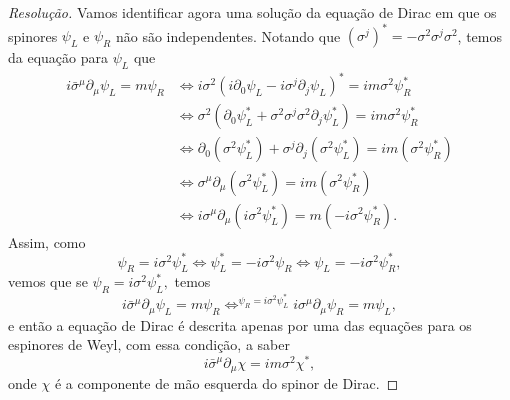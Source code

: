 \begin{proof}[Resolução]
    Vamos identificar agora uma solução da equação de Dirac em que os spinores \(\psi_L\) e \(\psi_R\) não são independentes. Notando que \((\sigma^j)^* = - \sigma^2 \sigma^j \sigma^2\), temos da equação para \(\psi_L\) que
    \begin{align*}
        i \bar{\sigma}^\mu \partial_\mu \psi_L = m \psi_R
        &\iff i\sigma^2 (i \partial_0 \psi_L - i \sigma^j\partial_j \psi_L)^* = im \sigma^2 \psi_R^*\\
        &\iff \sigma^2(\partial_0 \psi_L^* + \sigma^2 \sigma^j \sigma^2 \partial_j \psi_L^*) = im \sigma^2 \psi_R^*\\
        &\iff \partial_0 (\sigma^2 \psi_L^*) + \sigma^j \partial_j (\sigma^2 \psi_L^*) = im (\sigma^2 \psi_R^*)\\
        &\iff \sigma^\mu\partial_\mu (\sigma^2 \psi_L^*) = im (\sigma^2\psi_R^*)\\
        &\iff i \sigma^\mu \partial_\mu (i\sigma^2 \psi_L^*) = m(-i \sigma^2\psi_R^*).
    \end{align*}
    Assim, como
    \begin{equation*}
        \psi_R = i\sigma^2 \psi_L^*
        \iff \psi_L^* = -i\sigma^2 \psi_R
        \iff \psi_L = -i \sigma^2 \psi_R^*,
    \end{equation*}
    vemos que se \(\psi_R = i \sigma^2 \psi_L^*,\) temos
    \begin{equation*}
        i \bar{\sigma}^\mu \partial_\mu \psi_L = m \psi_R \mathop{\iff}^{\psi_R = i \sigma^2 \psi_L^*} i \sigma^\mu \partial_\mu \psi_R = m \psi_L,
    \end{equation*}
    e então a equação de Dirac é descrita apenas por uma das equações para os espinores de Weyl, com essa condição, a saber
    \begin{equation*}
        i \bar{\sigma}^\mu \partial_\mu \chi = i m \sigma^2 \chi^*,
    \end{equation*}
    onde \(\chi\) é a componente de mão esquerda do spinor de Dirac.


\end{proof}
